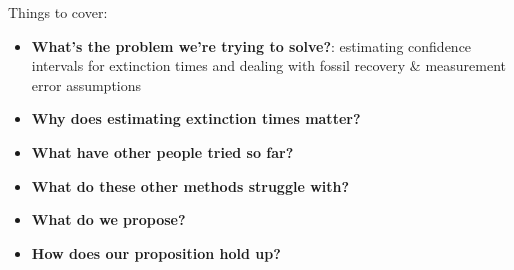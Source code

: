
Things to cover:

\begin{itemize}
    \item \textbf{What's the problem we're trying to solve?}: estimating confidence intervals for extinction times and dealing with fossil recovery \& measurement error assumptions
    \item \textbf{Why does estimating extinction times matter?}
    \item \textbf{What have other people tried so far?}
    \item \textbf{What do these other methods struggle with?}
    \item \textbf{What do we propose?}
    \item \textbf{How does our proposition hold up?}
\end{itemize}

